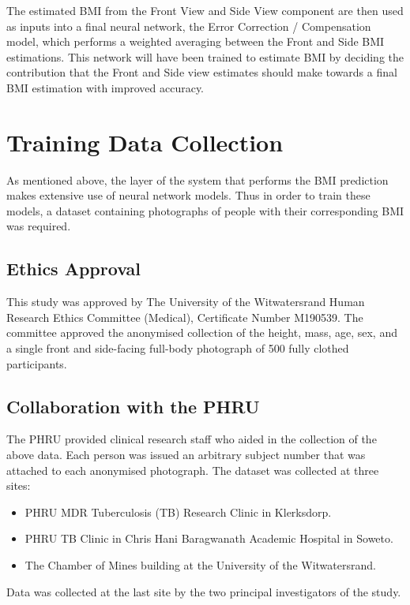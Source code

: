 \documentclass[conference]{IEEEtran}
\begin{document}
The estimated BMI from the Front View and Side View component are then used as inputs into a final neural network, the Error Correction / Compensation model, which performs a weighted averaging between the Front and Side BMI estimations.
This network will have been trained to estimate BMI by deciding the contribution that the Front and Side view estimates should make towards a final BMI estimation with improved accuracy.
\section{Training Data Collection}
As mentioned above, the layer of the system that performs the BMI prediction makes extensive use of neural network models.
Thus in order to train these models, a dataset containing photographs of people with their corresponding BMI was required.
\subsection{Ethics Approval}
This study was approved by The University of the Witwatersrand Human Research Ethics Committee (Medical), Certificate Number M190539.
The committee approved the anonymised collection of the height, mass, age, sex, and a single front and side-facing full-body photograph of 500 fully clothed participants.
\subsection{Collaboration with the PHRU}
The PHRU provided clinical research staff who aided in the collection of the above data.
Each person was issued an arbitrary subject number that was attached to each anonymised photograph.
The dataset was collected at three sites:
\begin{itemize}
	\item PHRU MDR Tuberculosis (TB) Research Clinic in Klerksdorp.
	\item PHRU TB Clinic in Chris Hani Baragwanath Academic Hospital in Soweto.
	\item The Chamber of Mines building at the University of the Witwatersrand.
\end{itemize}
Data was collected at the last site by the two principal investigators of the study.
\end{document}
